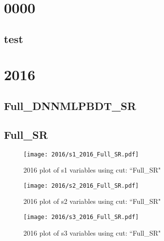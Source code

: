 \documentclass{article}
\begin{document}
    \graphicspath{ {../../plots/} }
    \listoffigures
    \section*{0000}
      \subsection*{test}
    \section*{2016}
      \subsection*{Full\_DNNMLPBDT\_SR}
      \subsection*{Full\_SR}
                        \begin{figure}[H]
                            \centering
                            \caption{2016 plot of s1 variables using cut: ``Full\_SR"}
                            \texttt{[image: 2016/s1\_2016\_Full\_SR.pdf]}
                        \end{figure}    
                        \begin{figure}[H]
                            \centering
                            \caption{2016 plot of s2 variables using cut: ``Full\_SR"}
                            \texttt{[image: 2016/s2\_2016\_Full\_SR.pdf]}
                        \end{figure}    
                        \begin{figure}[H]
                            \centering
                            \caption{2016 plot of s3 variables using cut: ``Full\_SR"}
                            \texttt{[image: 2016/s3\_2016\_Full\_SR.pdf]}
                        \end{figure}    
\end{document}
